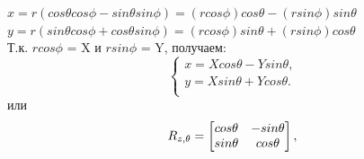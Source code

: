 $x=r(cos\theta cos\phi - sin \theta sin \phi) = (rcos \phi)cos \theta - (rsin\phi)sin\theta$\\
$y=r(sin\theta cos\phi + cos \theta sin\phi) = (rcos\phi)sin\theta + (rsin\phi)cos\theta$\\
Т.к. $rcos\phi$ = X и $rsin\phi$ = Y, получаем:\\
\begin{equation*}
 \begin{cases}
x=Xcos\theta - Ysin\theta,\\
y=Xsin\theta + Ycos\theta.\\
 \end{cases}
\end{equation*}
или\\
\begin{equation*}\label{eq:model}
R_{z, \theta} = 
     \begin{bmatrix}
       cos\theta & -sin\theta \\
    sin\theta & cos\theta \\
      \end{bmatrix}
    , \\
\end{equation*} \\

